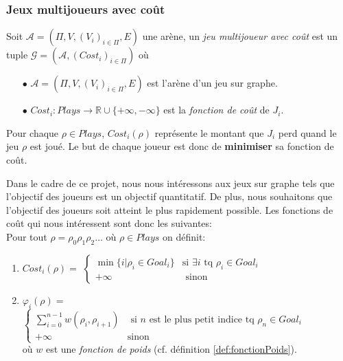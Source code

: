 

\subsubsection{Jeux multijoueurs avec coût}

\begin{defi}
	Soit $\mathcal{A} = (\Pi, V, (V_{i})_{i \in \Pi},E)$ une arène,
	un \textit{jeu multijoueur avec coût} est un tuple $\mathcal{G} = (\mathcal{A},(Cost_{i})_{i \in \Pi})$ où
	\begin{enumerate}
		\item[$\bullet$] $\mathcal{A} = (\Pi ,V ,(V_{i})_{i \in \Pi} ,E )$ est l'arène d'un jeu sur graphe.
		\item[$\bullet$] $Cost_{i}: Plays \rightarrow \mathbb{R} \cup \{ +\infty , -\infty \} $ est la \textit{fonction de coût} de $J_{i}$. 
	\end{enumerate}
\end{defi}


	Pour chaque $\rho \in Plays$, $Cost_{i}(\rho)$ représente le montant que $J_{i}$ perd quand le jeu $\rho$ est joué.
	Le but de chaque joueur est donc de \textbf{minimiser} sa fonction de coût.

\begin{exemple}
	\label{ex:fonctionsCout}
  Dans le cadre de ce projet, nous nous intéressons aux jeux sur graphe tels que l'objectif des joueurs est un objectif quantitatif. De plus, nous souhaitons que l'objectif des joueurs soit atteint le plus rapidement possible. Les fonctions de coût qui nous intéressent sont donc les suivantes: \\
	
	Pour tout  $\rho = \rho _{0} \rho _{1} \rho _{2} \ldots $ où $\rho \in Plays$ on définit:
	\begin{enumerate}
	\item $Cost_{i}(\rho) = $ $\begin{cases} 
									\min \{ i | \rho _{i} \in Goal_{i} \} & \text{si } \exists i \text{ tq } \rho _{i} \in Goal_{i} \\
									
									+\infty & \text{ sinon}
									\end{cases}$
	\item $\varphi _{i}(\rho) = $ $\begin{cases}
									\sum_{i = 0}^{n-1} w(\rho_{i},\rho_{i+1}) & \text{ si } n \text{ est le plus petit indice tq } \rho_{n}\in Goal_{i}\\
									+\infty & \text{sinon}
									\end{cases}$ \\
									où $w$ est une \textit{fonction de poids} (cf. définition \ref{def:fonctionPoids}).
	\end{enumerate}
\end{exemple}

